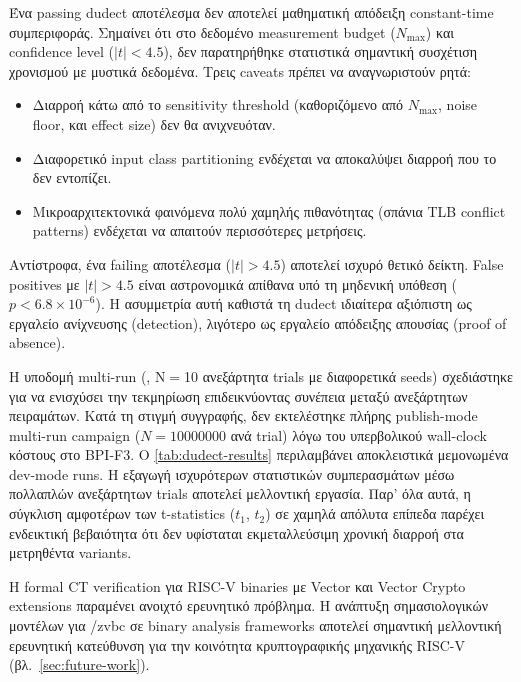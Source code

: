 Ένα passing dudect αποτέλεσμα δεν αποτελεί μαθηματική απόδειξη
constant-time συμπεριφοράς. Σημαίνει ότι στο δεδομένο measurement budget
($N_{\max}$) και confidence level ($|t| < 4.5$), δεν παρατηρήθηκε
στατιστικά σημαντική συσχέτιση χρονισμού με μυστικά δεδομένα. Τρεις
caveats πρέπει να αναγνωριστούν ρητά:
\begin{itemize}
  \item Διαρροή κάτω από το sensitivity threshold (καθοριζόμενο από
    $N_{\max}$, noise floor, και effect size) δεν θα ανιχνευόταν.
  \item Διαφορετικό input class partitioning ενδέχεται να αποκαλύψει
    διαρροή που το  δεν εντοπίζει.
  \item Μικροαρχιτεκτονικά φαινόμενα πολύ χαμηλής πιθανότητας (σπάνια
    TLB conflict patterns) ενδέχεται να απαιτούν περισσότερες μετρήσεις.
\end{itemize}

Αντίστροφα, ένα failing αποτέλεσμα ($|t| > 4.5$) αποτελεί ισχυρό θετικό
δείκτη. False positives με $|t| > 4.5$ είναι αστρονομικά απίθανα υπό
τη μηδενική υπόθεση ($p < 6.8 \times 10^{-6}$). Η ασυμμετρία αυτή
καθιστά τη dudect ιδιαίτερα αξιόπιστη ως εργαλείο ανίχνευσης (detection),
λιγότερο ως εργαλείο απόδειξης απουσίας (proof of absence).

Η υποδομή multi-run (, N$=$10 ανεξάρτητα trials με
διαφορετικά seeds) σχεδιάστηκε για να ενισχύσει την τεκμηρίωση
επιδεικνύοντας συνέπεια μεταξύ ανεξάρτητων πειραμάτων. Κατά τη στιγμή
συγγραφής, δεν εκτελέστηκε πλήρης publish-mode multi-run campaign
($N = \num{10000000}$ ανά trial) λόγω του υπερβολικού wall-clock κόστους
στο BPI-F3. Ο \cref{tab:dudect-results} περιλαμβάνει αποκλειστικά
μεμονωμένα dev-mode runs. Η εξαγωγή ισχυρότερων στατιστικών
συμπερασμάτων μέσω πολλαπλών ανεξάρτητων trials αποτελεί μελλοντική
εργασία. Παρ' όλα αυτά, η σύγκλιση αμφοτέρων των t-statistics ($t_1$,
$t_2$) σε χαμηλά απόλυτα επίπεδα παρέχει ενδεικτική βεβαιότητα ότι δεν
υφίσταται εκμεταλλεύσιμη χρονική διαρροή στα μετρηθέντα variants.

Η formal CT verification για RISC-V binaries με Vector και Vector Crypto
extensions παραμένει ανοιχτό ερευνητικό πρόβλημα. Η ανάπτυξη
σημασιολογικών μοντέλων για \RVV/\gls{zvbc} σε binary analysis frameworks
αποτελεί σημαντική μελλοντική ερευνητική κατεύθυνση για την κοινότητα
κρυπτογραφικής μηχανικής RISC-V (βλ.\ \cref{sec:future-work}).

